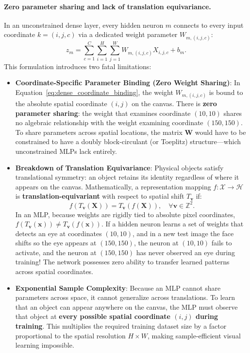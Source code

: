 \paragraph{Zero parameter sharing and lack of translation equivariance.}
In an unconstrained dense layer, every hidden neuron $m$ connects to every input coordinate $k = (i, j, c)$ via a dedicated weight parameter $W_{m, (i, j, c)}$:
\begin{equation}
z_m = \sum_{c=1}^C \sum_{i=1}^H \sum_{j=1}^W W_{m, (i, j, c)} X_{i, j, c} + b_m.
\label{eq:dense_coordinate_binding}
\end{equation}
This formulation introduces two fatal limitations:
\begin{itemize}[leftmargin=*]
  \item \textbf{Coordinate-Specific Parameter Binding (Zero Weight Sharing)}: In Equation~\eqref{eq:dense_coordinate_binding}, the weight $W_{m, (i, j, c)}$ is bound to the absolute spatial coordinate $(i, j)$ on the canvas. There is \textbf{zero parameter sharing}: the weight that examines coordinate $(10, 10)$ shares no algebraic relationship with the weight examining coordinate $(150, 150)$. To share parameters across spatial locations, the matrix $\mathbf{W}$ would have to be constrained to have a doubly block-circulant (or Toeplitz) structure---which unconstrained MLPs lack entirely.
  \item \textbf{Breakdown of Translation Equivariance}: Physical objects satisfy translational symmetry: an object retains its identity regardless of where it appears on the canvas. Mathematically, a representation mapping $f: \mathcal{X} \to \mathcal{H}$ is \textbf{translation-equivariant} with respect to spatial shift $T_{\mathbf{v}}$ if:
    \begin{equation}
    f(T_{\mathbf{v}}(\mathbf{X})) = T_{\mathbf{v}}(f(\mathbf{X})), \quad \forall \mathbf{v} \in \mathbb{Z}^2.
    \end{equation}
    In an MLP, because weights are rigidly tied to absolute pixel coordinates, $f(T_{\mathbf{v}}(\mathbf{x})) \ne T_{\mathbf{v}}(f(\mathbf{x}))$. If a hidden neuron learns a set of weights that detects an eye at coordinates $(10, 10)$, and in a new test image the face shifts so the eye appears at $(150, 150)$, the neuron at $(10, 10)$ fails to activate, and the neuron at $(150, 150)$ has never observed an eye during training! The network possesses zero ability to transfer learned patterns across spatial coordinates.
  \item \textbf{Exponential Sample Complexity}: Because an MLP cannot share parameters across space, it cannot generalize across translations. To learn that an object can appear anywhere on the canvas, the MLP must observe that object at \textbf{every possible spatial coordinate $(i, j)$ during training}. This multiplies the required training dataset size by a factor proportional to the spatial resolution $H \times W$, making sample-efficient visual learning impossible.
\end{itemize}

